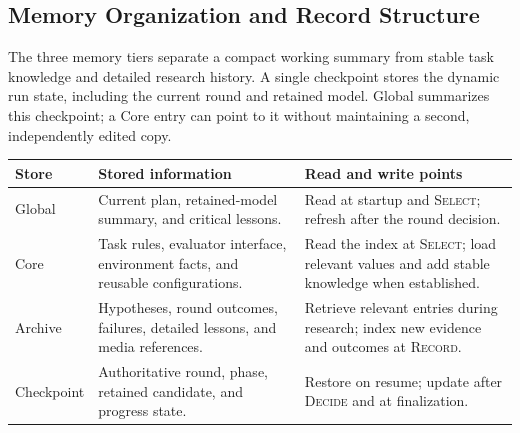 \subsection{Memory Organization and Record Structure}
\label{app:mmresearch-records}
The three memory tiers separate a compact working summary from stable task knowledge and detailed research history. A single checkpoint stores the dynamic run state, including the current round and retained model. Global summarizes this checkpoint; a Core entry can point to it without maintaining a second, independently edited copy.

\begin{center}
\begin{tabularx}{\linewidth}{@{}lXX@{}}
\toprule
\textbf{Store} & \textbf{Stored information} & \textbf{Read and write points} \\
\midrule
Global & Current plan, retained-model summary, and critical lessons. & Read at startup and \textsc{Select}; refresh after the round decision. \\
Core & Task rules, evaluator interface, environment facts, and reusable configurations. & Read the index at \textsc{Select}; load relevant values and add stable knowledge when established. \\
Archive & Hypotheses, round outcomes, failures, detailed lessons, and media references. & Retrieve relevant entries during research; index new evidence and outcomes at \textsc{Record}. \\
Checkpoint & Authoritative round, phase, retained candidate, and progress state. & Restore on resume; update after \textsc{Decide} and at finalization. \\
\bottomrule
\end{tabularx}
\end{center}
